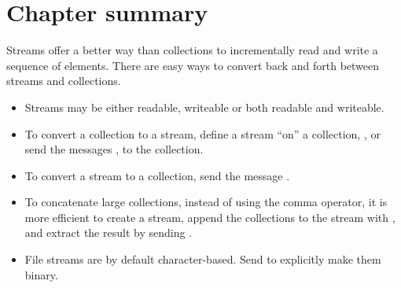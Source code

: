 \documentclass[a4paper,10pt,twoside]{book}
\begin{document}
\section{Chapter summary}

Streams offer a better way than collections to incrementally read and write a sequence of elements. There are easy ways to convert back and forth between streams and collections.

\begin{itemize}
  \item Streams may be either readable, writeable or both readable and writeable.
  \item To convert a collection to a stream, define a stream ``on'' a collection, \eg {}, or send the messages , \etc to the collection.
  \item To convert a stream to a collection, send the message .
  \item To concatenate large collections, instead of using the comma operator, it is more efficient to create a stream, append the collections to the stream with , and extract the result by sending .
  \item File streams are by default character-based. Send  to explicitly make them binary.
\end{itemize}

\ifx\wholebook\relax\else
\end{document}
